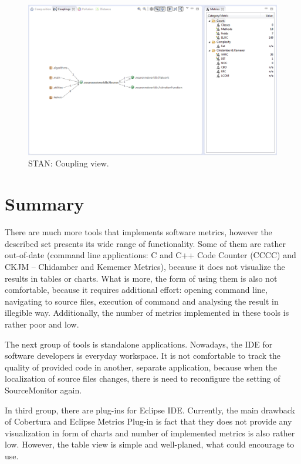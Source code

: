 \begin{figure}[h!]
	\centering
	\includegraphics[scale=0.5]{img/stan2.png} 
	\caption{STAN: Coupling view.}		
	\label{fig:stan2}
\end{figure}

\newpage

\section{Summary}

There are much more tools that implements software metrics, however the described set presents its wide range of functionality. Some of them are rather out-of-date (command line applications: C and C++ Code Counter (CCCC) and CKJM -- Chidamber and Kememer Metrics), because it does not visualize the results in tables or charts. What is more, the form of using them is also not comfortable, because it requires additional effort: opening command line, navigating to source files, execution of command and analysing the result in illegible way. Additionally, the number of metrics implemented in these tools is rather poor and low.  

The next group of tools is standalone applications. Nowadays, the \ac{IDE} for software developers is everyday workspace. It is not comfortable to track the quality of provided code in another, separate application, because when the localization of source files changes, there is need to reconfigure the setting of SourceMonitor again. 

In third group, there are plug-ins for Eclipse \ac{IDE}. Currently, the main drawback of Cobertura and Eclipse Metrics Plug-in is fact that they does not provide any visualization in form of charts and number of implemented metrics is also rather low. However, the table view is simple and well-planed, what could encourage to use.

